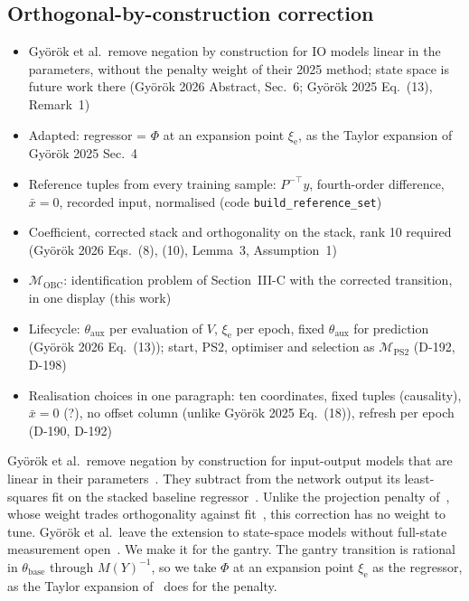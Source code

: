 \subsection{Orthogonal-by-construction correction}\label{sec:obc_map}
\ifdraft
\begin{itemize}
\item Gy\"or\"ok et al.\ remove negation by construction for IO models linear in the parameters, without the penalty weight of their 2025 method; state space is future work there (Gy\"or\"ok 2026 Abstract, Sec.~6; Gy\"or\"ok 2025 Eq.~(13), Remark~1)
\item Adapted: regressor = $\Phi$ at an expansion point $\xi_{\mathrm e}$, as the Taylor expansion of Gy\"or\"ok 2025 Sec.~4
\item Reference tuples from every training sample: $P^{-\top}y$, fourth-order difference, $\bar x=0$, recorded input, normalised (code \texttt{build\_reference\_set})
\item Coefficient, corrected stack and orthogonality on the stack, rank 10 required (Gy\"or\"ok 2026 Eqs.~(8), (10), Lemma~3, Assumption~1)
\item $\mathcal M_{\mathrm{OBC}}$: identification problem of Section~III-C with the corrected transition, in one display (this work)
\item Lifecycle: $\theta_{\mathrm{aux}}$ per evaluation of $V$, $\xi_{\mathrm e}$ per epoch, fixed $\theta_{\mathrm{aux}}$ for prediction (Gy\"or\"ok 2026 Eq.~(13)); start, PS2, optimiser and selection as $\mathcal M_{\mathrm{PS2}}$ (D-192, D-198)
\item Realisation choices in one paragraph: ten coordinates, fixed tuples (causality), $\bar x=0$ (?), no offset column (unlike Gy\"or\"ok 2025 Eq.~(18)), refresh per epoch (D-190, D-192)
\end{itemize}
\fi

Gy\"or\"ok et al.\ remove negation by construction for input-output models
that are linear in their parameters~\cite[Abstract, Sec.~2]{gyorok2026obc}.
They subtract from the network output its least-squares fit on the stacked
baseline regressor~\cite[Eqs.~(8), (10)]{gyorok2026obc}.
Unlike the projection penalty of~\cite[Eq.~(13)]{gyorok2025l4dc}, whose weight
trades orthogonality against fit~\cite[Remark~1]{gyorok2025l4dc}, this
correction has no weight to tune.
Gy\"or\"ok et al.\ leave the extension to state-space models without
full-state measurement open~\cite[Sec.~6]{gyorok2026obc}.
We make it for the gantry.
The gantry transition is rational in $\theta_{\mathrm{base}}$ through
$M(Y)^{-1}$, so we take $\Phi$ at an expansion point $\xi_{\mathrm e}$ as the
regressor, as the Taylor expansion of~\cite[Sec.~4]{gyorok2025l4dc} does for
the penalty.

